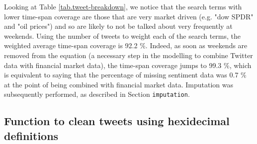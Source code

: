 \documentclass{article}
\begin{document}
Looking at Table \ref{tab.tweet-breakdown}, we notice that the search terms with lower time-span coverage are those that are very market driven (e.g. "dow SPDR" and "oil prices") and so are likely to not be talked about very frequently at weekends. Using the number of tweets to weight each of the search terms, the weighted average time-span coverage is 92.2 \%. Indeed, as soon as weekends are removed from the equation (a necessary step in the modelling to combine Twitter data with financial market data), the time-span coverage jumps to 99.3 \%, which is equivalent to saying that the percentage of missing sentiment data was 0.7 \% at the point of being combined with financial market data. Imputation was subsequently performed, as described in Section \texttt{imputation}.

\pagebreak


\subsection{Function to clean tweets using hexidecimal definitions}
\label{sec-1-4}
\end{document}

